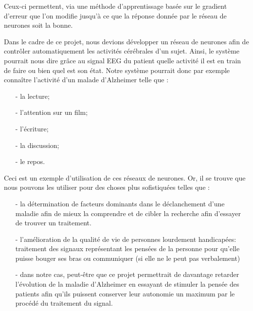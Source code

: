        Ceux-ci permettent, via une méthode d'apprentissage basée sur le gradient d'erreur que l'on modifie jusqu'à ce que la réponse donnée par le réseau de neurones soit la bonne.

	   Dans le cadre de ce projet, nous devions développer un réseau de neurones afin de contrôler automatiquement les activités cérébrales d'un sujet. Ainsi, le système pourrait nous dire grâce au signal EEG du patient quelle activité il est en train de faire ou bien quel est son état. Notre système pourrait donc par exemple connaître l'activité d'un malade d'Alzheimer telle que :
	   \begin{itemize}
	   	\item[-] la lecture;
		\item[-] l'attention sur un film;
		\item[-] l'écriture;
		\item[-] la discussion;
		\item[-] le repos.
	   \end{itemize}

	   Ceci est un exemple d'utilisation de ces réseaux de neurones. Or, il se trouve que nous pouvons les utiliser pour des choses plus sofistiquées telles que :
	   \begin{itemize}
	   \item[-]la détermination de facteurs dominants dans le déclanchement d'une maladie afin de mieux la comprendre et de cibler la recherche afin d'essayer de trouver un traitement.
	   \item[-]l'amélioration de la qualité de vie de personnes lourdement handicapées: traitement des signaux représentant les pensées de la personne pour qu'elle puisse bouger ses bras ou communiquer (si elle ne le peut pas verbalement)
	   \item[-]dans notre cas, peut-être que ce projet permettrait de davantage retarder l'évolution de la maladie d'Alzheimer en essayant de stimuler la pensée des patients afin qu'ils puissent conserver leur autonomie un maximum par le procédé du traitement du signal.
	   \end{itemize}
	
	
	
	

